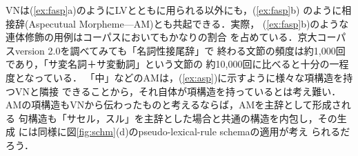 VNは(\ref{ex:fasp}a)のようにLVとともに用られる以外にも，(\ref{ex:fasp}b) 
のように相接辞(Aspecutual Morpheme---AM)とも共起できる．実際，
(\ref{ex:fasp}b)のような連体修飾の用例はコーパスにおいてもかなりの割合
を占めている．京大コーパスversion 2.0を調べてみても「名詞性接尾辞」で
終わる文節の頻度は約1,000回であり，「サ変名詞＋サ変動詞」という文節の
約10,000回に比べると十分の一程度となっている．
「中」などのAMは，(\ref{ex:asp})に示すように様々な項構造を持つVNと隣接
できることから，それ自体が項構造を持っているとは考え難い．
AMの項構造もVNから伝わったものと考えるならば，AMを主辞として形成される
句構造も「サセル，スル」を主辞とした場合と共通の構造を内包し，その生成
には同様に図\ref{fig:schm}(d)のpseudo-lexical-rule schemaの適用が考え
られるだろう．
